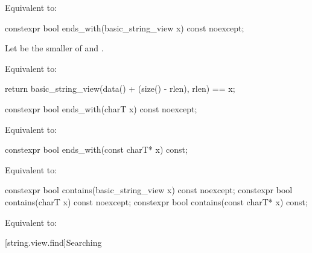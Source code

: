 \begin{itemdescr}
\pnum
\effects
Equivalent to: 
\end{itemdescr}

%
\begin{itemdecl}
constexpr bool ends_with(basic_string_view x) const noexcept;
\end{itemdecl}

\begin{itemdescr}
\pnum
Let  be the smaller of  and .

\pnum
\effects
Equivalent to:
\begin{codeblock}
return basic_string_view(data() + (size() - rlen), rlen) == x;
\end{codeblock}
\end{itemdescr}

%
\begin{itemdecl}
constexpr bool ends_with(charT x) const noexcept;
\end{itemdecl}

\begin{itemdescr}
\pnum
\effects
Equivalent to: 
\end{itemdescr}

%
\begin{itemdecl}
constexpr bool ends_with(const charT* x) const;
\end{itemdecl}

\begin{itemdescr}
\pnum
\effects
Equivalent to: 
\end{itemdescr}

%
\begin{itemdecl}
constexpr bool contains(basic_string_view x) const noexcept;
constexpr bool contains(charT x) const noexcept;
constexpr bool contains(const charT* x) const;
\end{itemdecl}

\begin{itemdescr}
\pnum
\effects
Equivalent to: 
\end{itemdescr}

[string.view.find]{Searching}


